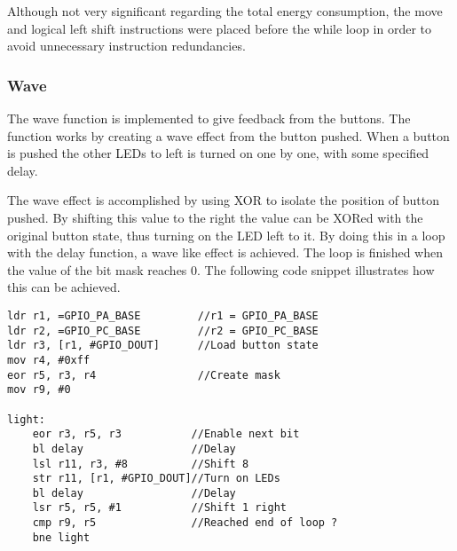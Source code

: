 Although not very significant regarding the total energy consumption, the move and logical left shift instructions were placed before the while loop in order to avoid unnecessary instruction redundancies.

\subsubsection{Wave}
The wave function is implemented to give feedback from the buttons. The function works by creating a wave effect from the button pushed. When a button is pushed the other LEDs to left is turned on one by one, with some specified delay. 

The wave effect is accomplished by using XOR to isolate the position of button pushed. By shifting this value to the right the value can be XORed with the original button state, thus turning on the LED left to it. By doing this in a loop with the delay function, a wave like effect is achieved. The loop is finished when the value of the bit mask reaches 0. The following code snippet illustrates how this can be achieved. 

\begin{lstlisting}
ldr r1, =GPIO_PA_BASE         //r1 = GPIO_PA_BASE
ldr r2, =GPIO_PC_BASE         //r2 = GPIO_PC_BASE
ldr r3, [r1, #GPIO_DOUT]      //Load button state
mov r4, #0xff               
eor r5, r3, r4                //Create mask 
mov r9, #0

light:
    eor r3, r5, r3           //Enable next bit  
    bl delay                 //Delay
    lsl r11, r3, #8          //Shift 8   
    str r11, [r1, #GPIO_DOUT]//Turn on LEDs 
    bl delay                 //Delay
    lsr r5, r5, #1           //Shift 1 right 
    cmp r9, r5               //Reached end of loop ? 
    bne light
\end{lstlisting}

 












